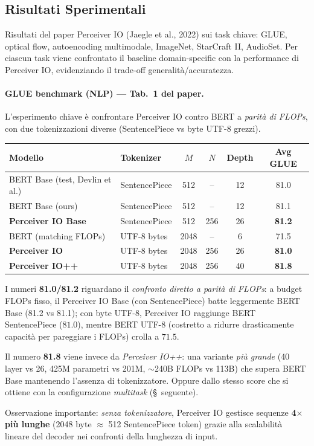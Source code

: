 \documentclass[
  11pt,
]{article}
\begin{document}
\subsection{Risultati Sperimentali}
\label{sec:io-results}

Risultati del paper Perceiver IO (Jaegle et al., 2022) sui task chiave: GLUE, optical flow, autoencoding multimodale, ImageNet, StarCraft II, AudioSet. Per ciascun task viene confrontato il baseline domain-specific con la performance di Perceiver IO, evidenziando il trade-off generalità/accuratezza.

\paragraph{GLUE benchmark (NLP) --- Tab.\ 1 del paper.} L'esperimento chiave è confrontare Perceiver IO contro BERT a \emph{parità di FLOPs}, con due tokenizzazioni diverse (SentencePiece vs byte UTF-8 grezzi).

{\small
\begin{longtable}{@{}p{4.5cm} p{2.5cm} c c c c@{}}
\toprule
\textbf{Modello} & \textbf{Tokenizer} & \textbf{$M$} & \textbf{$N$} & \textbf{Depth} & \textbf{Avg GLUE} \\
\midrule
\endhead
BERT Base (test, Devlin et al.) & SentencePiece & 512 & -- & 12 & 81.0 \\[2pt]
BERT Base (ours) & SentencePiece & 512 & -- & 12 & 81.1 \\[2pt]
\textbf{Perceiver IO Base} & SentencePiece & 512 & 256 & 26 & \textbf{81.2} \\[2pt]
\midrule
BERT (matching FLOPs) & UTF-8 bytes & 2048 & -- & 6 & 71.5 \\[2pt]
\textbf{Perceiver IO} & UTF-8 bytes & 2048 & 256 & 26 & \textbf{81.0} \\[2pt]
\textbf{Perceiver IO++} & UTF-8 bytes & 2048 & 256 & 40 & \textbf{81.8} \\
\bottomrule
\end{longtable}
}

\begin{notabox}[title={\textbf{Perceiver IO su GLUE: due risultati, uno spesso confuso}}]
I numeri \textbf{81.0/81.2} riguardano il \emph{confronto diretto a parità di FLOPs}: a budget FLOPs fisso, il Perceiver IO Base (con SentencePiece) batte leggermente BERT Base (81.2 vs 81.1); con byte UTF-8, Perceiver IO raggiunge BERT SentencePiece ($81.0$), mentre BERT UTF-8 (costretto a ridurre drasticamente capacità per pareggiare i FLOPs) crolla a $71.5$.

Il numero \textbf{81.8} viene invece da \emph{Perceiver IO++}: una variante \emph{più grande} (40 layer vs 26, 425M parametri vs 201M, $\sim$240B FLOPs vs 113B) che supera BERT Base mantenendo l'assenza di tokenizzatore. Oppure dallo stesso score che si ottiene con la configurazione \emph{multitask} (\S~seguente).

Osservazione importante: \emph{senza tokenizzatore}, Perceiver IO gestisce sequenze \textbf{4$\times$ più lunghe} (2048 byte $\approx$ 512 SentencePiece token) grazie alla scalabilità lineare del decoder nei confronti della lunghezza di input.
\end{notabox}
\end{document}
